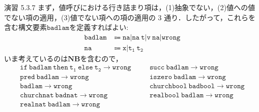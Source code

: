 \documentclass[9pt]{beamer}
\begin{document}
\begin{frame}{演習 5.3.7}
	まず，値呼びにおける行き詰まり項は，(1)抽象でない，(2)値への値でない項の適用，(3)値でない項への項の適用の 3 通り．したがって，これらを含む構文要素$\mathtt{badlam}$を定義すればよい:
	\begin{align*}
	\mathtt{badlam}&\Coloneq \mathtt{na|na\ t|v\ na|wrong}\\
	\mathtt{na}&\Coloneq \mathtt{x|t_{1}\ t_{2}}
	\end{align*}
	いま考えているのは$\mathbf{NB}$を含むので，
	\begin{align*}
		\mathtt{if\ badlam\ then\ t_{1}\ else\ t_{2}}\rightarrow \mathtt{wrong}&\quad&\mathtt{succ\ badlam}\rightarrow \mathtt{wrong}\\
		\mathtt{pred\ badlam}\rightarrow \mathtt{wrong}&\quad&\mathtt{iszero\ badlam}\rightarrow \mathtt{wrong}\\
		\mathtt{badlam}\rightarrow \mathtt{wrong}&\quad&\mathtt{churchbool\ badbool}\rightarrow\mathtt{wrong}\\
		\mathtt{churchnat\ badnat}\rightarrow\mathtt{wrong}&\quad&\mathtt{realbool\ badlam}\rightarrow\mathtt{wrong}\\
		\mathtt{realnat\ badlam}\rightarrow\mathtt{wrong}
	\end{align*}
\end{frame}
\end{document}
